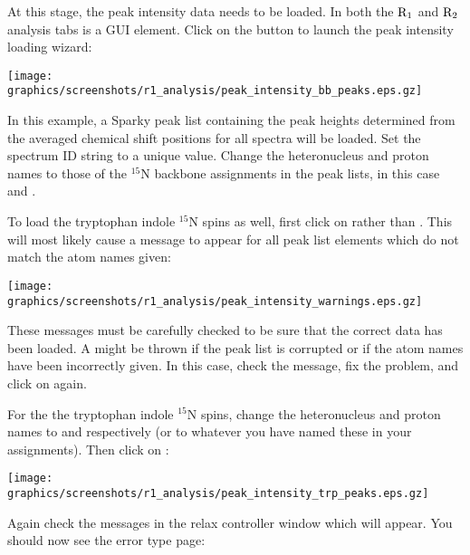 At this stage, the peak intensity data needs to be loaded.  In both the $\mathrm{R}_1$ and $\mathrm{R}_2$ analysis tabs is a  GUI element.  Click on the  button to launch the peak intensity loading wizard:

\begin{minipage}[h]{\linewidth}
\centerline{\texttt{[image: graphics/screenshots/r1\_analysis/peak\_intensity\_bb\_peaks.eps.gz]}}
\end{minipage}

In this example, a Sparky peak list containing the peak heights determined from the averaged chemical shift positions for all spectra will be loaded.  Set the spectrum ID string to a unique value.  Change the heteronucleus and proton names to those of the $^{15}$N backbone assignments in the peak lists, in this case  and .

To load the tryptophan indole $^{15}$N spins as well, first click on  rather than .  This will most likely cause a  message to appear for all peak list elements which do not match the atom names given:

\begin{minipage}[h]{\linewidth}
\centerline{\texttt{[image: graphics/screenshots/r1\_analysis/peak\_intensity\_warnings.eps.gz]}}
\end{minipage}

These messages must be carefully checked to be sure that the correct data has been loaded.  A  might be thrown if the peak list is corrupted or if the atom names have been incorrectly given.  In this case, check the message, fix the problem, and click on  again.

For the the tryptophan indole $^{15}$N spins, change the heteronucleus and proton names to  and  respectively (or to whatever you have named these in your assignments).  Then click on :

\begin{minipage}[h]{\linewidth}
\centerline{\texttt{[image: graphics/screenshots/r1\_analysis/peak\_intensity\_trp\_peaks.eps.gz]}}
\end{minipage}

Again check the messages in the relax controller window which will appear.  You should now see the error type page:

